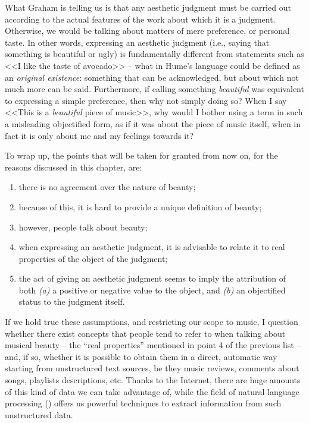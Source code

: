 What Graham is telling us is that any aesthetic judgment must be carried out according to the actual features of the work about which it is a judgment. Otherwise, we would be talking about matters of mere preference, or personal taste. In other words, expressing an aesthetic judgment (i.e., saying that something is beautiful or ugly) is fundamentally different from statements such as <<I like the taste of avocado>> -- what in Hume's language could be defined as an \emph{original existence}: something that can be acknowledged, but about which not much more can be said. Furthermore, if calling something \emph{beautiful} was equivalent to expressing a simple preference, then why not simply doing so? When I say <<This is a \emph{beautiful} piece of music>>, why would I bother using a term in such a misleading objectified form, as if it was about the piece of music itself, when in fact it is only about me and my feelings towards it?

To wrap up, the points that will be taken for granted from now on, for the reasons discussed in this chapter, are:
\begin{enumerate}
	\item there is no agreement over the nature of beauty;
	\item because of this, it is hard to provide a unique definition of beauty;
	\item however, people talk about beauty;
	\item when expressing an aesthetic judgment, it is advisable to relate it to real properties of the object of the judgment;
	\item the act of giving an aesthetic judgment seems to imply the attribution of both \emph{(a)} a positive or negative value to the object, and \emph{(b)} an objectified status to the judgment itself.
\end{enumerate}

If we hold true these assumptions, and restricting our scope to music, I question whether there exist concepts that people tend to refer to when talking about musical beauty -- the ``real properties'' mentioned in point 4 of the previous list -- and, if so, whether it is possible to obtain them in a direct, automatic way starting from unstructured text sources, be they music reviews, comments about songs, playlists descriptions, etc. Thanks to the Internet, there are huge amounts of this kind of data we can take advantage of, while the field of natural language processing () offers us powerful techniques to extract information from such unstructured data.

